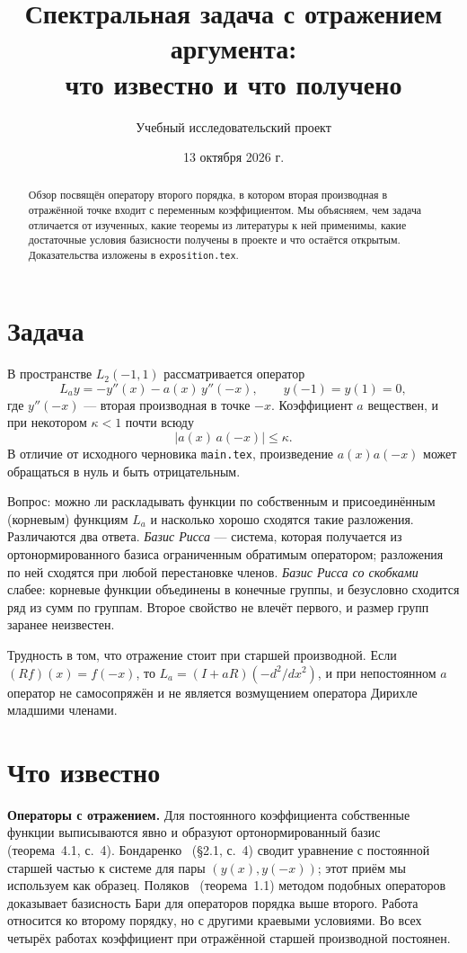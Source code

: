 \documentclass[12pt,a4paper]{article}
\title{Спектральная задача с отражением аргумента:\\
что известно и что получено}
\author{Учебный исследовательский проект}
\date{13 октября 2026 г.}
\begin{document}
\sloppy
\maketitle
\begin{abstract}
Обзор посвящён оператору второго порядка, в котором вторая производная в отражённой
точке входит с переменным коэффициентом. Мы объясняем, чем задача отличается от
изученных, какие теоремы из литературы к ней применимы, какие достаточные условия
базисности получены в проекте и что остаётся открытым. Доказательства изложены в
\texttt{exposition.tex}.
\end{abstract}

\section{Задача}
В пространстве $L_2(-1,1)$ рассматривается оператор
\[
 L_ay=-y''(x)-a(x)\,y''(-x),\qquad y(-1)=y(1)=0,
\]
где $y''(-x)$ --- вторая производная в точке $-x$. Коэффициент $a$ веществен, и при
некотором $\kappa<1$ почти всюду
\begin{equation}\label{eq:bound}
 |a(x)\,a(-x)|\le\kappa .
\end{equation}
В отличие от исходного черновика \texttt{main.tex}, произведение $a(x)a(-x)$ может
обращаться в нуль и быть отрицательным.

Вопрос: можно ли раскладывать функции по собственным и присоединённым (корневым)
функциям $L_a$ и насколько хорошо сходятся такие разложения. Различаются два ответа.
\emph{Базис Рисса} --- система, которая получается из ортонормированного базиса
ограниченным обратимым оператором; разложения по ней сходятся при любой перестановке
членов. \emph{Базис Рисса со скобками} слабее: корневые функции объединены в конечные
группы, и безусловно сходится ряд из сумм по группам. Второе свойство не влечёт первого,
и размер групп заранее неизвестен.

Трудность в том, что отражение стоит при старшей производной. Если $(Rf)(x)=f(-x)$, то
$L_a=(I+aR)(-d^2/dx^2)$, и при непостоянном $a$ оператор не самосопряжён и не является
возмущением оператора Дирихле младшими членами.

\section{Что известно}
\textbf{Операторы с отражением.} Для постоянного коэффициента собственные функции
выписываются явно и образуют ортонормированный базис~\cite{S2} (теорема~4.1, с.~4).
Бондаренко~\cite{S1} (\S2.1, с.~4) сводит уравнение с постоянной старшей частью к системе
для пары $(y(x),y(-x))$; этот приём мы используем как образец. Поляков~\cite{S5}
(теорема~1.1) методом подобных операторов доказывает базисность Бари для операторов
порядка выше второго. Работа~\cite{S6} относится ко второму порядку, но с другими
краевыми условиями. Во всех четырёх работах коэффициент при отражённой старшей производной
постоянен.
\end{document}

